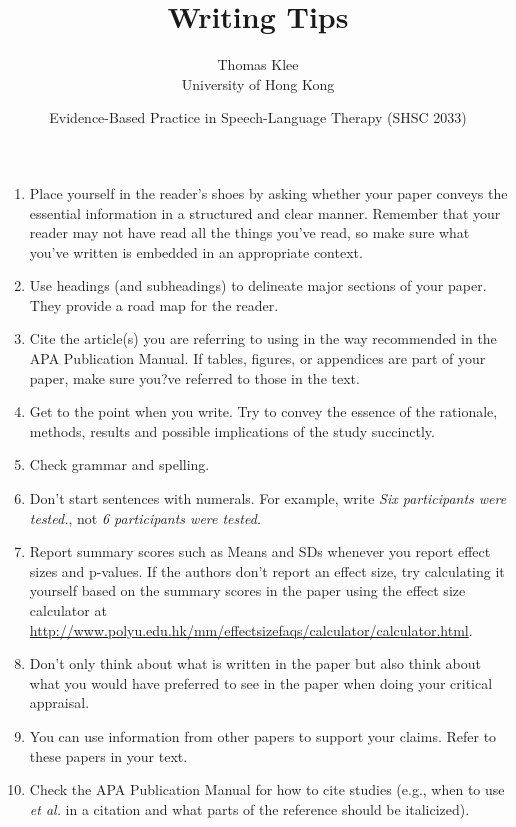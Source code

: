 \documentclass[a4paper]{article}
\title{Writing Tips}
\author{Thomas Klee  \\ University of Hong Kong}
\date{Evidence-Based Practice in Speech-Language Therapy (SHSC 2033)}
\begin{document}
\maketitle

\begin{enumerate}

\item Place yourself in the reader's shoes by asking whether your paper conveys the essential information in a structured and clear manner. Remember that your reader may not have read all the things you've read, so make sure what you've written is embedded in an appropriate context.

\item Use headings (and subheadings) to delineate major sections of your paper. They provide a road map for the reader.

\item Cite the article(s) you are referring to using in the way recommended in the APA Publication Manual. If tables, figures, or appendices are part of your paper, make sure you?ve referred to those in the text. 

\item Get to the point when you write. Try to convey the essence of the rationale, methods, results and possible implications of the study succinctly.

\item Check grammar and spelling. 

\item Don't start sentences with numerals. For example, write \emph{Six participants were tested.}, not \emph{6 participants were tested.} 

\item Report summary scores such as Means and SDs whenever you report effect sizes and p-values. If the authors don't report an effect size, try calculating it yourself based on the summary scores in the paper using the effect size calculator at \url{http://www.polyu.edu.hk/mm/effectsizefaqs/calculator/calculator.html}.

\item Don't only think about what is written in the paper but also think about what you would have preferred to see in the paper when doing your critical appraisal.

\item You can use information from other papers to support your claims. Refer to these papers in your text.

\item Check the APA Publication Manual for how to cite studies (e.g., when to use \emph{et al.} in a citation and what parts of the reference should be italicized).

\end{enumerate}
\end{document}
